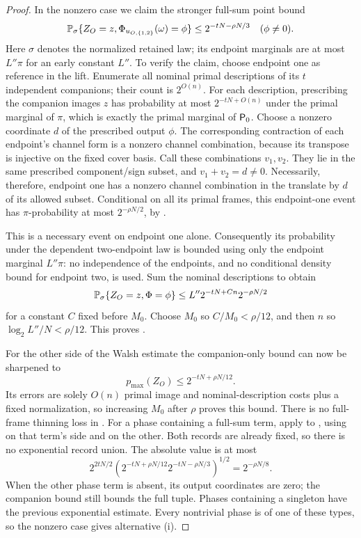 \begin{proof}
In the nonzero case we claim the stronger full-sum point bound
\begin{equation}
 \mathbb P_\sigma\{Z_O=z,
       \Phi_{u_{O,\{1,2\}}}(\omega)=\phi\}
 \le 2^{-tN-\rho N/3}
 \quad(\phi\ne0).
 \label{eq:tp-fullsum-pmax}
\end{equation}
Here \(\sigma\) denotes the normalized retained law; its endpoint
marginals are at most \(L''\pi\) for an early constant \(L''\).
To verify the claim, choose endpoint one as reference in the lift.
Enumerate all nominal primal descriptions of its \(t\) independent
companions; their count is \(2^{O(n)}\).  For each description,
prescribing the companion images \(z\) has probability at most
\(2^{-tN+O(n)}\) under the primal marginal of \(\pi\), which is
exactly the primal marginal of \({\mathsf P_0}\).
Choose a nonzero coordinate \(d\) of the prescribed output \(\phi\).
The corresponding contraction of each endpoint's channel form is
a nonzero channel combination, because its transpose is injective
on the fixed cover basis.  Call these combinations \(v_1,v_2\).
They lie in the same prescribed component/sign subset, and
\(v_1+v_2=d\ne0\).  Necessarily, therefore, endpoint one has a
nonzero channel combination in the translate by \(d\) of its
allowed subset.  Conditional on all its primal frames, this
endpoint-one event has \(\pi\)-probability at most
\(2^{-\rho N/2}\), by .

This is a necessary event on endpoint one alone.  Consequently
its probability under the dependent two-endpoint law is bounded
using only the endpoint marginal \(L''\pi\): no independence of
the endpoints, and no conditional density bound for endpoint two,
is used.  Sum the nominal descriptions to obtain
\[
 \mathbb P_\sigma\{Z_O=z,\Phi=\phi\}
 \le L''2^{-tN+C n}2^{-\rho N/2}
\]
for a constant \(C\) fixed before \(M_0\).
Choose \(M_0\) so \(C/M_0<\rho/12\), and then \(n\) so
\(\log_2 L''/N<\rho/12\).  This proves
.

For the other side of the Walsh estimate the companion-only
bound can now be sharpened to
\begin{equation}
 p_{\max}(Z_O)\le2^{-tN+\rho N/12}.
 \label{eq:tp-fine-companion-pmax}
\end{equation}
Its errors are solely \(O(n)\) primal image and nominal-description
costs plus a fixed normalization, so increasing \(M_0\) after
\(\rho\) proves this bound.  There is no full-frame thinning loss
in .
For a phase containing a full-sum term, apply  to
, using
 on that term's side and
 on the other.  Both records are
already fixed, so there is no exponential record union.  The
absolute value is at most
\[
 2^{2tN/2}
 \left(2^{-tN+\rho N/12}2^{-tN-\rho N/3}\right)^{1/2}
 =2^{-\rho N/8}.
\]
When the other phase term is absent, its output coordinates are
zero; the companion bound still bounds the full tuple.  Phases
containing a singleton have the previous exponential estimate.
Every nontrivial phase is of one of these types, so the nonzero
case gives alternative \textup{(i)}.


\end{proof}
